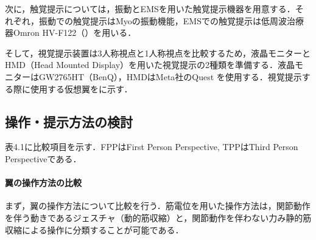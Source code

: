 \begin{small}
    次に，触覚提示については，振動とEMSを用いた触覚提示機器を用意する．それぞれ，振動での触覚提示はMyoの振動機能，EMSでの触覚提示は低周波治療器Omron HV-F122（）を用いる．


    そして，視覚提示装置は3人称視点と1人称視点を比較するため，液晶モニターとHMD（Head Mounted Display）を用いた視覚提示の2種類を準備する．液晶モニターはGW2765HT（BenQ），HMDはMeta社のQuest
    を使用する．視覚提示する際に使用する仮想翼をに示す．

  \subsection{操作・提示方法の検討}

    \begin{table}[tb]
        \begin{center}
            \caption{Comparison items}
        \end{center}
    \end{table}

    表4.1に比較項目を示す．FPPはFirst Person Perspective, TPPはThird Person Perspectiveである．


   \paragraph{翼の操作方法の比較} %
      まず，翼の操作方法について比較を行う．筋電位を用いた操作方法は，関節動作を伴う動きであるジェスチャ（動的筋収縮）と，関節動作を伴わない力み静的筋収縮\cite{thistle1967isokinetic}による操作に分類することが可能である．


\end{small}

